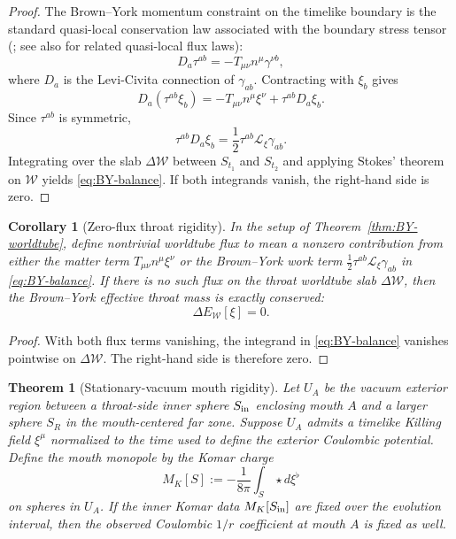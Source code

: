 \documentclass[aps,prd,onecolumn,nofootinbib,superscriptaddress]{revtex4-2}
\newtheorem{theorem}{Theorem}
\newtheorem{corollary}{Corollary}
\begin{document}
\begin{proof}
The Brown--York momentum constraint on the timelike boundary is the standard
quasi-local conservation law associated with the boundary stress tensor
(\cite{BrownYork1993Quasilocal}; see also
\cite{EppMcGrathMann2013Momentum} for related quasi-local flux laws):
\begin{equation}
  D_a\tau^{ab} = - T_{\mu\nu}n^\mu\gamma^{\nu b},
\end{equation}
where $D_a$ is the Levi-Civita connection of $\gamma_{ab}$.  Contracting with
$\xi_b$ gives
\begin{equation}
  D_a(\tau^{ab}\xi_b)
  =
  -T_{\mu\nu}n^\mu\xi^\nu
  + \tau^{ab}D_a\xi_b.
\end{equation}
Since $\tau^{ab}$ is symmetric,
\begin{equation}
  \tau^{ab}D_a\xi_b
  = \frac12\tau^{ab}\mathcal{L}_\xi\gamma_{ab}.
\end{equation}
Integrating over the slab $\Delta\mathcal{W}$ between $S_{t_1}$ and $S_{t_2}$
and applying Stokes' theorem on $\mathcal{W}$ yields
\eqref{eq:BY-balance}.  If both integrands vanish, the right-hand side is zero.
\end{proof}

\begin{corollary}[Zero-flux throat rigidity]
\label{cor:zero-flux-throat}
In the setup of Theorem~\ref{thm:BY-worldtube}, define nontrivial
worldtube flux to mean a nonzero contribution from either the matter term
$T_{\mu\nu}n^\mu\xi^\nu$ or the Brown--York work term
$\frac12\tau^{ab}\mathcal{L}_\xi\gamma_{ab}$ in \eqref{eq:BY-balance}.  If
there is no such flux on the throat worldtube slab $\Delta\mathcal{W}$, then
the Brown--York effective throat mass is exactly conserved:
\begin{equation}
  \Delta E_{\mathcal{W}}[\xi]=0.
\end{equation}
\end{corollary}

\begin{proof}
With both flux terms vanishing, the integrand in \eqref{eq:BY-balance}
vanishes pointwise on $\Delta\mathcal{W}$.  The right-hand side is therefore
zero.
\end{proof}

\begin{theorem}[Stationary-vacuum mouth rigidity]
\label{thm:stationary-mouth}
Let $U_A$ be the vacuum exterior region between a throat-side inner sphere
$S_{\rm in}$ enclosing mouth $A$ and a larger sphere $S_R$ in the mouth-centered
far zone.  Suppose $U_A$ admits a timelike Killing field $\xi^\mu$ normalized to
the time used to define the exterior Coulombic potential.  Define the mouth
monopole by the Komar charge~\cite{Komar1959Covariant}
\begin{equation}
  M_K[S] := -\frac{1}{8\pi}\int_S \star d\xi^\flat
\end{equation}
on spheres in $U_A$.  If the inner Komar data $M_K[S_{\rm in}]$ are fixed over
the evolution interval, then the observed Coulombic $1/r$ coefficient at mouth
$A$ is fixed as well.
\end{theorem}
\end{document}
